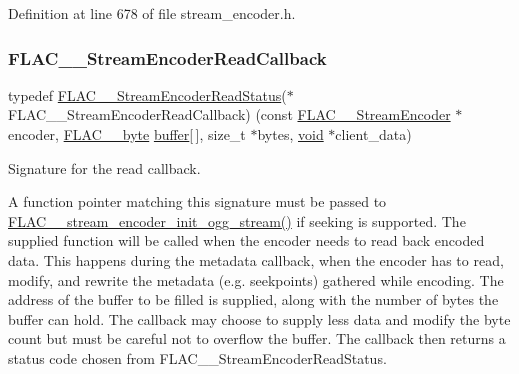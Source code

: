 Definition at line 678 of file stream\+\_\+encoder.\+h.

\mbox{\label{group__flac__stream__encoder_ga18b7941b93bae067192732e913536d44}} 
\subsubsection{\texorpdfstring{FLAC\_\_StreamEncoderReadCallback}{FLAC\_\_StreamEncoderReadCallback}}
{\footnotesize\ttfamily typedef \mbox{\hyperlink{group__flac__stream__encoder_ga2e81f007fb0a7414c0bbb453f37ea37f}{F\+L\+A\+C\+\_\+\+\_\+\+Stream\+Encoder\+Read\+Status}}($\ast$ F\+L\+A\+C\+\_\+\+\_\+\+Stream\+Encoder\+Read\+Callback) (const \mbox{\hyperlink{struct_f_l_a_c_____stream_encoder}{F\+L\+A\+C\+\_\+\+\_\+\+Stream\+Encoder}} $\ast$encoder, \mbox{\hyperlink{ordinals_8h_a5eb569b12d5b047cdacada4d57924ee3}{F\+L\+A\+C\+\_\+\+\_\+byte}} \mbox{\hyperlink{_s_d_l__opengl__glext_8h_a76461e97a098d2c9ae20ac193d3825ae}{buffer}}\mbox{[}$\,$\mbox{]}, size\+\_\+t $\ast$bytes, \mbox{\hyperlink{_s_d_l__opengles2__gl2ext_8h_ae5d8fa23ad07c48bb609509eae494c95}{void}} $\ast$client\+\_\+data)}

Signature for the read callback.

A function pointer matching this signature must be passed to \mbox{\hyperlink{group__flac__stream__encoder_ga87af71d74c09f7d482f9f420ef9bf826}{F\+L\+A\+C\+\_\+\+\_\+stream\+\_\+encoder\+\_\+init\+\_\+ogg\+\_\+stream()}} if seeking is supported. The supplied function will be called when the encoder needs to read back encoded data. This happens during the metadata callback, when the encoder has to read, modify, and rewrite the metadata (e.\+g. seekpoints) gathered while encoding. The address of the buffer to be filled is supplied, along with the number of bytes the buffer can hold. The callback may choose to supply less data and modify the byte count but must be careful not to overflow the buffer. The callback then returns a status code chosen from F\+L\+A\+C\+\_\+\+\_\+\+Stream\+Encoder\+Read\+Status.

